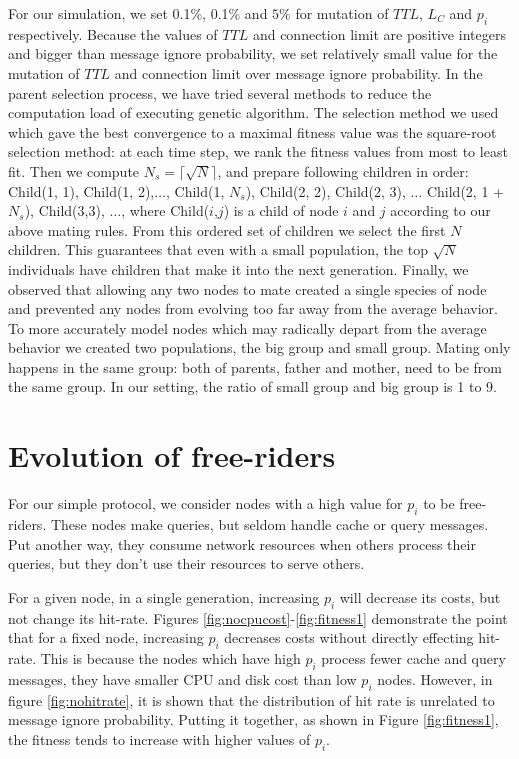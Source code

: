 \documentclass[12pt,journal,draftcls,letterpaper,onecolumn]{IEEEtran}
\begin{document}
For our simulation, we set 0.1\%, 0.1\% and $5\%$ for mutation of $TTL$, $L_C$
and $p_i$ respectively. Because the values of $TTL$ and connection limit are
positive integers and bigger than message ignore probability, we set relatively small value for
the mutation of $TTL$ and connection limit over message ignore probability. In
the parent selection
process, we have tried several methods to reduce the computation load of
executing genetic algorithm.  The selection method we used which gave the best
convergence to a maximal fitness value was
the square-root selection method: at each time step, we rank the fitness values
from most to least fit.  Then we compute $N_s = \lceil\sqrt{N}\rceil$, and prepare
following children in order: Child(1, 1), Child(1, 2),$\ldots$, Child(1, $N_s$),
Child(2, 2), Child(2, 3), $\ldots$ Child(2, 1 + $N_s$), Child(3,3), $\ldots$, where
Child($i$,$j$) is a child of node $i$ and $j$ according to our above mating rules.
From
this ordered set of children we select the first $N$ children.  This guarantees
that even with a small population, the top $\sqrt{N}$ individuals have children
that make it into the next generation.
Finally, we observed that allowing any two nodes to mate created a single
species of node and prevented any nodes from evolving too far away from the
average behavior.  To more accurately model nodes which may radically depart
from the average behavior we created two populations, the big group and small
group. Mating only happens in the same group: both of parents, father and mother, need to be
from the same group. In our setting, the ratio of small group and big group is 1 to 9.

\section{Evolution of free-riders}\label{sec:evolution}

For our simple protocol, we consider nodes with a high value for $p_i$ to be
free-riders.  These nodes make queries, but seldom handle cache or query
messages.  Put another way, they consume network resources when others process
their queries, but they don't use their resources to serve others.

For a given node, in a single generation, increasing $p_i$ will decrease its
costs, but not change its hit-rate.  Figures
\ref{fig:nocpucost}-\ref{fig:fitness1} demonstrate the point that for a fixed
node, increasing $p_i$ decreases costs without directly effecting hit-rate.
This is because
the nodes which have high $p_i$ process fewer cache and query
messages, they have smaller CPU and disk cost than low $p_i$ nodes. However, in
figure \ref{fig:nohitrate}, it is shown that the distribution of hit rate is unrelated to message ignore
probability.
Putting it together, as shown in Figure \ref{fig:fitness1}, the fitness tends
to increase with higher values of $p_i$.
\end{document}
